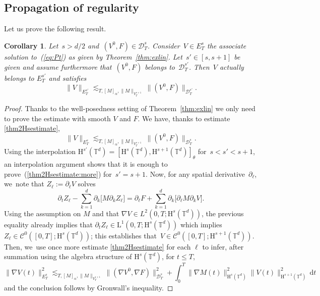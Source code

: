 \documentclass[JEP,XML,SOM,Unicode,published]{cedram}
\newtheorem{coro}[prop]{Corollary}
\theoremstyle{definition}
\newcommand\T{\mathbb{T}}
\newcommand\dd{\mathrm{d}}
\renewcommand\H{\mathrm{H}}
\renewcommand\L{\mathrm{L}}
\begin{document}
\subsection{Propagation of regularity}
Let us prove the following result.
\begin{coro}\label{coro:thm2}
Let~$s>d/2$ and~$(V^0,F) \in \mathcal D_T^s$. Consider~$V \in E_T^s$ the associate solution to~{\rm(\ref{eq:Pt})} as given by Theorem~\ref{thm:exlin}. Let~$s' \in [s,s+1]$ be given and assume furthermore that~$(V^0,F)$ belongs to~$\mathcal D_T^{s'}$. Then~$V$ actually belongs to $E_T^{s'}$ and satisfies
\begin{equation}\label{thm2Hsestimate:more}
\| V \|_{E_T^{s'}} \lesssim_{T,[M]_{\alpha},\|M\|_{Y_T^{s+1}}} \| (V^0,F)\|_{\mathcal D_T^{s'}}.\end{equation}
\end{coro}
\begin{proof}[Proof]
Thanks to the well-posedness setting of Theorem~\ref{thm:exlin} we only need to prove the estimate with smooth $V$ and $F$.
We have, thanks to estimate \eqref{thm2Hsestimate},\vspace*{-3pt}
\[
\| V \|_{E_T^s} \lesssim_{T,[M]_{\alpha},\|M\|_{Y_T^{s+1}}} \| (V^0,F)\| _{\mathcal D_T^{s}}.
\]
Using the interpolation $\H^{s'}(\T^d) = [\H^{s}(\T^d),\H^{s+1}(\T^d)]_\theta$ for~$
s<s'<s+1$, an interpolation argument shows that it is enough to prove~(\ref{thm2Hsestimate:more}) for~$s'=s+1$.
Now, for any spatial derivative~$\partial_\ell$, we~note that $Z_\ell:=\partial_\ell V$ solves\vspace*{-3pt}
\[
\partial_t Z_\ell - \sum_{k=1}^d \partial_k \bigl[ M \partial_k Z_\ell\bigr] = \partial_\ell F + \sum_{k=1}^d \partial_k \bigl[ \partial_\ell M \partial_k V\bigr].
\]
Using the assumption on $M$ and that $\nabla V \in L^2(0,T;\H^s(\T^d))$, the previous equality already implies that $\partial_t Z_\ell \in\L^1(0,T;\H^s(\T^d))$ which implies $Z_\ell\in\mathscr{C}^0([0,T];\H^s(\T^d))$; this establishes that~$V\in\mathscr{C}^0([0,T];\H^{s+1}(\T^d))$. Then, we~use once more estimate \eqref{thm2Hsestimate} for each $\ell$ to infer, after summation using the algebra structure of $\H^s(\T^d)$, for $t\leq T$,\vspace*{-3pt}
\[
\| \nabla V(t) \|_{E_T^s}^2 \lesssim_{T,[M]_{\alpha},\|M\|_{Y_T^{s+1}}} \| (\nabla V^0,\nabla F)\|_{\mathcal D_T^{s}}^2 \!+\! \int_0^T \big \|\nabla M(t)\|_{\H^{s }(\T^d)}^2\| {V}(t)\|_{\H^{s+1}(\T^d)}^2\,\dd t
\]and the conclusion follows by Gronwall's inequality.
\end{proof}
\end{document}
